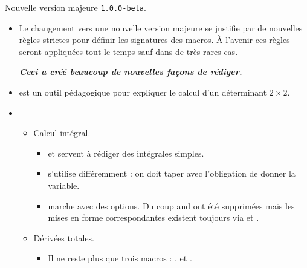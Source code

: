 Nouvelle version majeure \verb+1.0.0-beta+.

\begin{itemize}[itemsep=.5em]
    \item Le changement vers une nouvelle version majeure se justifie par de nouvelles règles strictes pour définir les signatures des macros. À l'avenir ces règles seront appliquées tout le temps sauf dans de très rares cas.
    \begin{center}
		\bfseries\itshape
		Ceci a créé beaucoup de nouvelles façons de rédiger.
    \end{center}





    \separation
    \item {}
           est un outil pédagogique pour expliquer le calcul d'un déterminant $2\times2$.




    \separation
    \item {}
    \begin{itemize}[itemsep=.5em]
        \item Calcul intégral.
        
        \begin{itemize}[itemsep=.5em, label=$\rightarrow$]
            \item {} et  servent à rédiger des intégrales simples.

            \item {} s'utilise différemment : on doit taper  avec l'obligation de donner la variable.
            
            \item {} marche avec des options.
                  Du coup  and  ont été supprimées mais les mises en forme correspondantes existent toujours via  et .
	    \end{itemize}
	    
        
        \item Dérivées totales.
        
        \begin{itemize}[itemsep=.5em, label=$\rightarrow$]
            \item Il ne reste plus que trois macros : ,  et .


\end{itemize}
\end{itemize}
\end{itemize}
